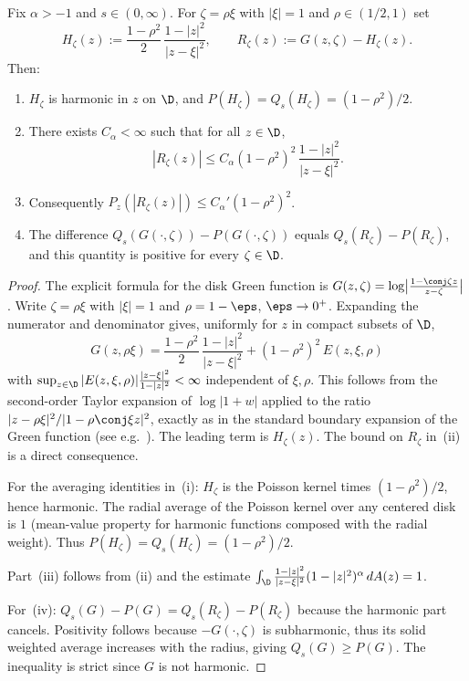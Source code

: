 \begin{numlemma}\label{lem:green-boundary-expansion}
Fix $\alpha>-1$ and $s\in(0,\infty)$.  For $\zeta=\rho\xi$ with
$|\xi|=1$ and $\rho\in(1/2,1)$ set
\[
H_\zeta(z):=\frac{1-\rho^2}{2}\,\frac{1-|z|^2}{|z-\xi|^2},
\qquad
R_\zeta(z):=G(z,\zeta)-H_\zeta(z).
\]
Then:
\begin{enumerate}[label=(\roman*)]
\item $H_\zeta$ is harmonic in $z$ on $\D$, and
$P(H_\zeta)=Q_s(H_\zeta)=(1-\rho^2)/2$.
\item There exists $C_{\alpha}<\infty$ such that for all
$z\in\D$,
\[
|R_\zeta(z)|
\le
C_{\alpha}(1-\rho^2)^2\,
\frac{1-|z|^2}{|z-\xi|^2}.
\]
\item Consequently
$P_z(|R_\zeta(z)|)\le C_{\alpha}'(1-\rho^2)^2$.
\item The difference $Q_s(G(\cdot,\zeta))-P(G(\cdot,\zeta))$ equals
$Q_s(R_\zeta)-P(R_\zeta)$, and this quantity is positive for every
$\zeta\in\D$.
\end{enumerate}
\end{numlemma}

\begin{proof}
The explicit formula for the disk Green function is
$G(z,\zeta)=\log\bigl|\frac{1-\conj\zeta z}{z-\zeta}\bigr|$.
Write $\zeta=\rho\xi$ with $|\xi|=1$ and $\rho=1-\eps$,
$\eps\to0^+$.  Expanding the numerator and denominator gives, uniformly
for $z$ in compact subsets of $\D$,
\[
G(z,\rho\xi)
=
\frac{1-\rho^2}{2}\,
\frac{1-|z|^2}{|z-\xi|^2}
+
(1-\rho^2)^2\,E(z,\xi,\rho)
\]
with $\sup_{z\in\D}|E(z,\xi,\rho)|\frac{|z-\xi|^2}{1-|z|^2}<\infty$
independent of $\xi,\rho$.  This follows from the second-order Taylor
expansion of $\log|1+w|$ applied to the ratio
$|z-\rho\xi|^2/|1-\rho\conj\xi z|^2$, exactly as in the standard boundary
expansion of the Green function (see e.g.\ \cite[Lemma~3.4]{kalajramos2024}).
The leading term is $H_\zeta(z)$.  The bound on $R_\zeta$ in~(ii) is a direct
consequence.

For the averaging identities in~(i): $H_\zeta$ is the Poisson kernel times
$(1-\rho^2)/2$, hence harmonic.  The radial average of the Poisson kernel
over any centered disk is $1$ (mean-value property for harmonic functions
composed with the radial weight).  Thus
$P(H_\zeta)=Q_s(H_\zeta)=(1-\rho^2)/2$.

Part~(iii) follows from (ii) and the estimate
$\int_\D\frac{1-|z|^2}{|z-\xi|^2}(1-|z|^2)^\alpha\,dA(z)=1$.

For~(iv): $Q_s(G)-P(G)=Q_s(R_\zeta)-P(R_\zeta)$ because the harmonic part
cancels.  Positivity follows because $-G(\cdot,\zeta)$ is subharmonic, thus
its solid weighted average increases with the radius, giving
$Q_s(G)\ge P(G)$.  The inequality is strict since $G$ is not harmonic.
\end{proof}


